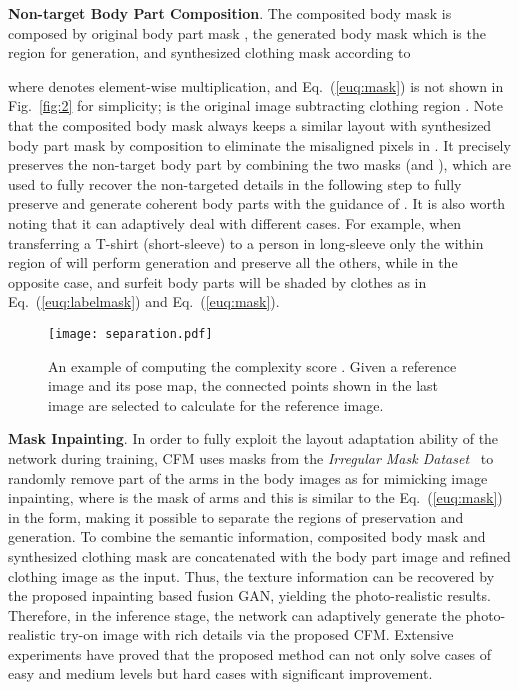 \documentclass[10pt,twocolumn,letterpaper]{article}
\begin{document}
\textbf{Non-target Body Part Composition}. The composited body mask  is composed by original body part mask , the generated body mask  which is the region for generation, and synthesized clothing mask  according to 



where  denotes element-wise multiplication, and Eq.~(\ref{euq:mask}) is not shown in Fig.~\ref{fig:2} for simplicity;  is the original image  subtracting clothing region . Note that the composited body mask  always keeps a similar layout with synthesized body part mask  by composition to eliminate the misaligned pixels in  .
It precisely preserves the non-target body part by combining the two masks (\ie  and ), which are used to fully recover the non-targeted details in the following step to fully preserve  and generate coherent body parts with the guidance of . It is also worth noting that it can adaptively deal with different cases. For example, when transferring a T-shirt (short-sleeve) to a person in long-sleeve only the within region of  will perform generation and preserve all the others, while in the opposite case,  and surfeit body parts will be shaded by clothes as in Eq.~(\ref{euq:labelmask}) and Eq.~(\ref{euq:mask}).

\begin{figure}[htb]
\begin{center}
\vspace{-5pt}
\texttt{[image: separation.pdf]}
\vspace{-10pt}
\end{center}
   \caption{\footnotesize An example of computing the complexity score . Given a reference image and its pose map, the connected points shown in the last image are selected to calculate  for the reference image.}
\label{fig:complexity}
\vspace{-10pt}
\end{figure}


\textbf{Mask Inpainting}. In order to fully exploit the layout adaptation ability of the network during training, CFM uses masks  from the \emph{Irregular Mask Dataset}~\cite{liu2018image} to randomly remove part of the arms in the body images  as   for mimicking image inpainting, where  is the mask of arms and this is similar to the Eq.~(\ref{euq:mask}) in the form, making it possible to separate the regions of preservation and generation. To combine the semantic information, composited body mask  and synthesized clothing mask  are concatenated with the body part image  and refined clothing  image  as the input.
Thus, the texture information can be recovered by the proposed inpainting based fusion GAN, yielding the photo-realistic results. Therefore,
in the inference stage, the network can adaptively generate the photo-realistic try-on image with rich details via the proposed CFM. Extensive experiments have proved that the proposed method can not only solve cases of easy and medium levels but hard cases with significant improvement.
\end{document}
